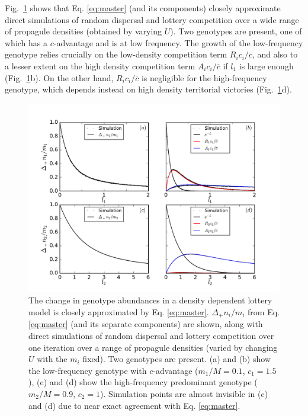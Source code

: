 \documentclass[11pt]{article}
\begin{document}
Fig.~\ref{fig:simcomp} shows that Eq. \eqref{eq:master} (and its components) closely approximate direct simulations of random dispersal and lottery competition over a wide range of propagule densities (obtained by varying $U$). Two genotypes are present, one of which has a $c$-advantage and is at low frequency. The growth of the low-frequency genotype relies crucially on the low-density competition term $R_i c_i/\overline{c}$, and also to a lesser extent on the high density competition term $A_i c_i/\overline{c}$ if $l_1$ is large enough (Fig.~\ref{fig:simcomp}b). On the other hand, $R_i c_i/\overline{c}$ is negligible for the high-frequency genotype, which depends instead on high density territorial victories (Fig.~\ref{fig:simcomp}d). 

\begin{figure}
\centering
\includegraphics[scale=0.7]{simulationcomparison.pdf}
\caption{\label{fig:simcomp} The change in genotype abundances in a density dependent lottery model is closely approximated by Eq. \eqref{eq:master}. $\Delta_+ n_i/m_i$ from Eq. \eqref{eq:master} (and its separate components) are shown, along with direct simulations of random dispersal and lottery competition over one iteration over a range of propagule densities (varied by changing $U$ with the $m_i$ fixed). Two genotypes are present. (a) and (b) show the low-frequency genotype with $c$-advantage ($m_1/M=0.1$, $c_1=1.5$), (c) and (d) show the high-frequency predominant genotype ($m_2/M=0.9$, $c_2=1$). Simulation points are almost invisible in (c) and (d) due to near exact agreement with Eq. \eqref{eq:master}.} 
\end{figure}
\end{document}
